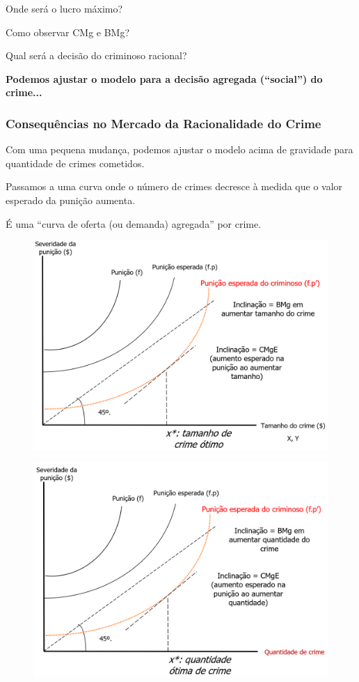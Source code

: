 \documentclass[a4paper,12pt]{article}[abntex2]
\begin{document}
Onde será o lucro máximo?

Como observar CMg e BMg?

Qual será a decisão do criminoso racional?

\textbf{Podemos ajustar o modelo para a decisão agregada (“social”) do crime...}

\subsubsection{\textbf{Consequências no Mercado da Racionalidade do Crime}}
Com uma pequena mudança, podemos ajustar o modelo acima de gravidade para quantidade de crimes cometidos.

Passamos a uma curva onde o número de crimes decresce à medida que o valor esperado da punição aumenta.

É uma “curva de oferta (ou demanda) agregada” por crime.

\begin{figure}[H]
    \centering
    \includegraphics[width=0.7\linewidth]{Imagens/a19i4.png}
\end{figure}

\begin{figure}[H]
    \centering
    \includegraphics[width=0.7\linewidth]{Imagens/a19i5.png}
\end{figure}
\end{document}
